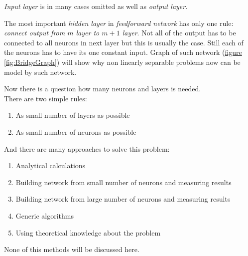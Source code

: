 \textit{Input layer} is in many cases omitted as well as \textit{output layer}.

The most important \textit{hidden layer} in \textit{feedforward network} has only one rule: \textit{connect output from $m$ layer to $m+1$ layer}. Not all of the output has to be connected to all neurons in next layer but this is usually the case. Still each of the neurons has to have its one constant input. Graph of such network (\hyperref[fig:BridgeGraph]{figure \ref{fig:BridgeGraph}}) will show why non linearly separable problems now can be model by such network.

\newpage
Now there is a question how many neurons and layers is needed. \\ There are two simple rules:
\begin{enumerate}[topsep=8pt,itemsep=-1ex,partopsep=1ex,parsep=1ex]
    \item As small number of layers as possible
    \item As small number of neurons as possible
\end{enumerate}
And there are many approaches to solve this problem:
\begin{enumerate}[topsep=8pt,itemsep=-1ex,partopsep=1ex,parsep=1ex]
    \item Analytical calculations
    \item Building network from small number of neurons and measuring results
    \item Building network from large number of neurons and measuring results
    \item Generic algorithms
    \item Using theoretical knowledge about the problem
\end{enumerate}
None of this methods will be discussed here.

